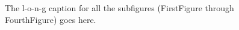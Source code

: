 \begin{figure}[!ht]
{        }%
        \caption{The l-o-n-g caption for all the subfigures (FirstFigure through FourthFigure) goes here.}
        \label{fig:subfigures}
      \end{figure}